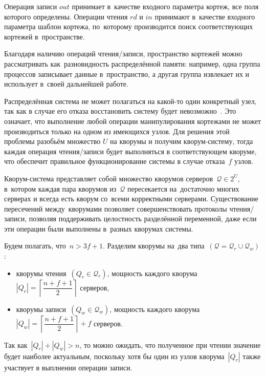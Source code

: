 Операция записи $out$ принимает в~качестве входного параметра кортеж, все поля которого определены. Операции чтения $rd$ и $in$ принимают в~качестве входного параметра шаблон кортежа, по~которому производится поиск соответствующих кортежей в~пространстве.

Благодаря наличию операций чтения/записи, пространство кортежей можно рассматривать как~разновидность распределённой памяти: например, одна группа процессов записывает данные в~пространство, а другая группа извлекает их и использует в~своей дальнейшей работе.

Распределённая система не может полагаться на какой-то один конкретный узел, так как в случае его отказа восстановить систему будет невозможно~\autocite{Kleppman}. Это означает, что выполнение любой операции манипулирования кортежами не может производиться только на одном из имеющихся узлов. Для решения этой проблемы разобьём множество $U$ на кворумы и получим кворум-систему, тогда каждая операция чтения/записи будет выполняться в соответствующем кворуме, что обеспечит правильное функционирование системы в случае отказа~$f$ узлов.

Кворум-система представляет собой множество кворумов серверов~$\mathcal{Q} \in 2^{U}$, в~котором каждая пара кворумов из~$\mathcal{Q}$ пересекается на~достаточно многих серверах и всегда есть кворум со~всеми корректными серверами. Существование пересечений между~кворумами позволяет совершенствовать протоколы чтения/записи, позволяя поддерживать целостность разделённой переменной, даже если эти операции были выполнены в~разных кворумах системы.

Будем полагать, что~$n > 3f + 1$. Разделим кворумы на~два типа~$(\mathcal{Q} = \mathcal{Q}_r \cup \mathcal{Q}_w)$:
\begin{itemize}
	\item кворумы чтения~$(Q_r \in \mathcal{Q}_r)$, мощность каждого кворума ~$|Q_r| = \left\lceil \dfrac{n+f+1}{2} \right\rceil$ серверов,
	\item кворумы записи~$(Q_w \in \mathcal{Q}_w)$, мощность каждого кворума~$|Q_w| = \left\lceil \dfrac{n+f+1}{2} \right\rceil + f$ серверов.
\end{itemize}
Так как~$|Q_r| + |Q_w| > n$, то можно ожидать, что полученное при чтении значение  будет наиболее актуальным, поскольку хотя бы один из узлов кворума~$|Q_r|$ также участвует в выплнении операции записи.

